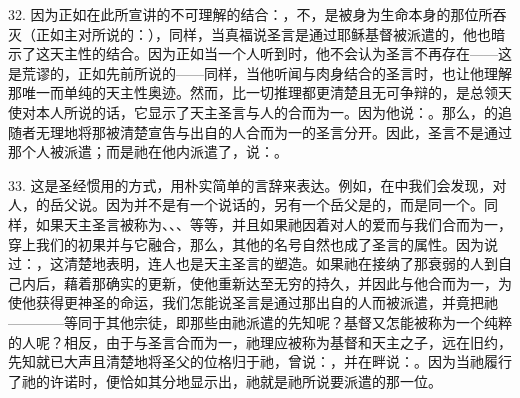 32. 因为正如在此所宣讲的不可理解的结合：，不，是被身为生命本身的那位所吞灭（正如主对所说的：），同样，当真福说圣言是通过耶稣基督被派遣的，他也暗示了这天主性的结合。因为正如当一个人听到时，他不会认为圣言不再存在——这是荒谬的，正如先前所说的——同样，当他听闻与肉身结合的圣言时，也让他理解那唯一而单纯的天主性奥迹。然而，比一切推理都更清楚且无可争辩的，是总领天使对本人所说的话，它显示了天主圣言与人的合而为一。因为他说：。那么，的追随者无理地将那被清楚宣告与出自的人合而为一的圣言分开。因此，圣言不是通过那个人被派遣；而是祂在他内派遣了，说：。\par

33. 这是圣经惯用的方式，用朴实简单的言辞来表达。例如，在中我们会发现，对人，的岳父说。因为并不是有一个说话的，另有一个岳父是的，而是同一个。同样，如果天主圣言被称为、、、等等，并且如果祂因着对人的爱而与我们合而为一，穿上我们的初果并与它融合，那么，其他的名号自然也成了圣言的属性。因为说过：，这清楚地表明，连人也是天主圣言的塑造。如果祂在接纳了那衰弱的人到自己内后，藉着那确实的更新，使他重新达至无穷的持久，并因此与他合而为一，为使他获得更神圣的命运，我们怎能说圣言是通过那出自的人而被派遣，并竟把祂————等同于其他宗徒，即那些由祂派遣的先知呢？基督又怎能被称为一个纯粹的人呢？相反，由于与圣言合而为一，祂理应被称为基督和天主之子，远在旧约，先知就已大声且清楚地将圣父的位格归于祂，曾说：，并在畔说：。因为当祂履行了祂的许诺时，便恰如其分地显示出，祂就是祂所说要派遣的那一位。\par

